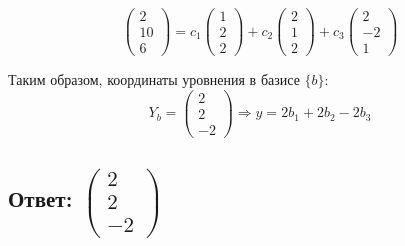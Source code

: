 \documentclass{article}
\begin{document}
        \[
        \begin{pmatrix} 2 \\ 10 \\ 6 \end{pmatrix} = c_1 \begin{pmatrix} 1 \\ 2 \\ 2 \end{pmatrix} + c_2 \begin{pmatrix} 2 \\ 1 \\ 2 \end{pmatrix} + c_3 \begin{pmatrix} 2 \\ -2 \\ 1 \end{pmatrix}
        \]
                
        
        Таким образом, координаты уровнения в базисе  $\{b\}$:
        \[
        Y_b = \begin{pmatrix} 2 \\ 2 \\ -2 \end{pmatrix} \Longrightarrow y = 2b_1 + 2b_2 - 2b_3
        \]
        
        \subsection{Ответ: $ \begin{pmatrix} 2 \\ 2 \\ -2 \end{pmatrix}$}
        
        
\end{document}
